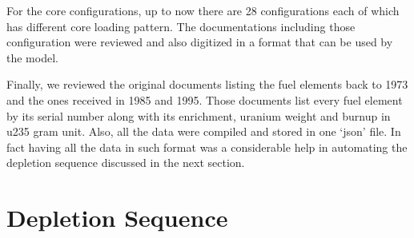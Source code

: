 \documentclass[review]{elsarticle}
\begin{document}
For the core configurations, up to now there are 28 configurations each of which has different core loading pattern. The documentations including those configuration were reviewed and also digitized in a format that can be used by the model.

Finally, we reviewed the original documents listing the fuel elements back to 1973 and the ones received in 1985 and 1995. Those documents list every fuel element by its serial number along with its enrichment, uranium weight and burnup in u235 gram unit. Also, all the data were compiled and stored in one `json' file.
In fact having all the data in such format was a considerable help in automating the depletion sequence discussed in the next section.

\section{Depletion Sequence}
\end{document}
